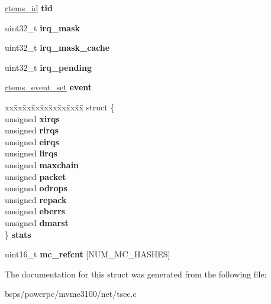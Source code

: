 \begin{DoxyCompactItemize}
\mbox{\hyperlink{group__ClassicTasks_gab20892b814dced7dd4e5b9bf42becd57}{rtems\+\_\+id}} {\bfseries tid}
\item 
\mbox{\label{structtsec__private_a5c1afa8b360cb805d91149c360b555eb}} 
uint32\+\_\+t {\bfseries irq\+\_\+mask}
\item 
\mbox{\label{structtsec__private_aac904ba754c5a570168553a075d29906}} 
uint32\+\_\+t {\bfseries irq\+\_\+mask\+\_\+cache}
\item 
\mbox{\label{structtsec__private_a309c5a95eee5105fa6474cd989171c95}} 
uint32\+\_\+t {\bfseries irq\+\_\+pending}
\item 
\mbox{\label{structtsec__private_a3d327c44ec5bb7d084da1de7a359a756}} 
\mbox{\hyperlink{group__ClassicEventSet_gab7b8f373bea85fd4e3b7ae23905faa07}{rtems\+\_\+event\+\_\+set}} {\bfseries event}
\item 
\mbox{\label{structtsec__private_aa4149d400048a3dd1c5b945b6cbe4f03}} 
\begin{tabbing}
xx\=xx\=xx\=xx\=xx\=xx\=xx\=xx\=xx\=\kill
struct \{\\
\>unsigned {\bfseries xirqs}\\
\>unsigned {\bfseries rirqs}\\
\>unsigned {\bfseries eirqs}\\
\>unsigned {\bfseries lirqs}\\
\>unsigned {\bfseries maxchain}\\
\>unsigned {\bfseries packet}\\
\>unsigned {\bfseries odrops}\\
\>unsigned {\bfseries repack}\\
\>unsigned {\bfseries eberrs}\\
\>unsigned {\bfseries dmarst}\\
\} {\bfseries stats}\\

\end{tabbing}\item 
\mbox{\label{structtsec__private_a521fa72e9a467a08294ed712ad16f93e}} 
uint16\+\_\+t {\bfseries mc\+\_\+refcnt} \mbox{[}N\+U\+M\+\_\+\+M\+C\+\_\+\+H\+A\+S\+H\+ES\mbox{]}
\end{DoxyCompactItemize}


The documentation for this struct was generated from the following file\+:\begin{DoxyCompactItemize}
\item 
bsps/powerpc/mvme3100/net/tsec.\+c\end{DoxyCompactItemize}
